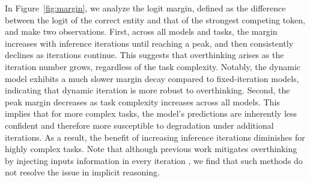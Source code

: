 \documentclass{article} %
\begin{document}
In Figure~\ref{fig:margin}, we analyze the logit margin, defined as the difference between the logit of the correct entity and that of the strongest competing token, and make two observations.
First, across all models and tasks, the margin increases with inference iterations until reaching a peak, and then consistently declines as iterations continue. 
This suggests that overthinking arises as the iteration number grows, regardless of the task complexity.
Notably, the dynamic model exhibits a much slower margin decay compared to fixed-iteration models, indicating that dynamic iteration is more robust to overthinking.
Second, the peak margin decreases as task complexity increases across all models. 
This implies that for more complex tasks, the model’s predictions are inherently less confident and therefore more susceptible to degradation under additional iterations. 
As a result, the benefit of increasing inference iterations diminishes for highly complex tasks.
Note that although previous work mitigates overthinking by injecting inputs information in every iteration \citep{bansal2022end, geiping2025scaling}, we find that such methods do not resolve the issue in implicit reasoning.


\end{document}
